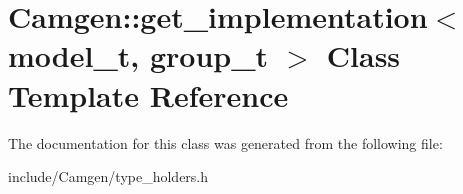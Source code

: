 \hypertarget{a00244}{\section{Camgen\-:\-:get\-\_\-implementation$<$ model\-\_\-t, group\-\_\-t $>$ Class Template Reference}
\label{a00244}
}


The documentation for this class was generated from the following file\-:\begin{DoxyCompactItemize}
\item 
include/\-Camgen/type\-\_\-holders.\-h\end{DoxyCompactItemize}

